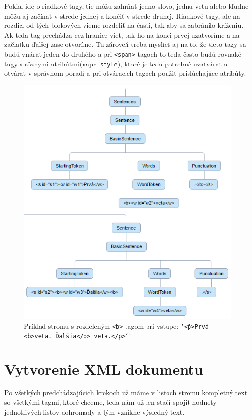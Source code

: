 \documentclass[12pt,a4paper]{report}
\theoremstyle{definition}
\theoremstyle{remark}
\begin{document}
Pokiaľ ide o riadkové tagy, tie môžu zahŕňať jedno slovo, jednu vetu alebo kľudne môžu aj začínať v strede jednej a končiť v strede druhej. Riadkové tagy, ale na rozdiel od tých blokových vieme rozdeliť na časti, tak aby sa zabránilo kríženiu. Ak teda tag prechádza cez hranice viet, tak ho na konci prvej uzatvoríme a na začiatku ďalšej zase otvoríme.
Tu zároveň treba myslieť aj na to, že tieto tagy sa budú vnárať jeden do druhého a pri \verb!<span>! tagoch to teda často budú rovnaké tagy s rôznymi atribútmi(napr. \verb!style!), ktoré je teda potrebné uzatvárať a otvárať v správnom poradí a pri otváracích tagoch použiť prislúchajúce atribúty.
\begin{figure}[H]
\centering
\includegraphics[scale=2.5]{dividedFormattingTags}
\captionsetup{width=.7\linewidth}
\caption{Príklad stromu s rozdeleným \texttt{<b>} tagom pri vstupe: \texttt{\char`\"<p>Prvá <b>veta. Ďalšia</b> veta.</p>\char`\"}}
\end{figure}

\section{Vytvorenie XML dokumentu}
Po všetkých predchádzajúcich krokoch už máme v listoch stromu kompletný text so všetkými tagmi, ktoré chceme, teda nám už len stačí spojiť hodnoty jednotlivých listov dohromady a tým vznikne výsledný text.
\end{document}
